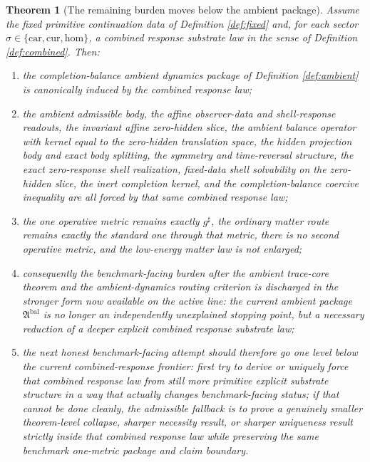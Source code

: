 \documentclass[11pt]{article}
\newcommand{\CompletedMetric}{g^{\sharp}}
\newcommand{\AmbientPackage}{\mathfrak A^{\mathrm{bal}}}
\newcommand{\Car}{\mathrm{car}}
\newcommand{\Cur}{\mathrm{cur}}
\newcommand{\Hom}{\mathrm{hom}}
\newtheorem{theorem}{Theorem}
\begin{document}
\begin{theorem}[The remaining burden moves below the ambient package]
\label{thm:main}
Assume the fixed primitive continuation data of Definition \ref{def:fixed} and, for each sector \(\sigma\in\{\Car,\Cur,\Hom\}\), a combined response substrate law in the sense of Definition \ref{def:combined}. Then:
\begin{enumerate}
    \item the completion-balance ambient dynamics package of Definition \ref{def:ambient} is canonically induced by the combined response law;
    \item the ambient admissible body, the affine observer-data and shell-response readouts, the invariant affine zero-hidden slice, the ambient balance operator with kernel equal to the zero-hidden translation space, the hidden projection body and exact body splitting, the symmetry and time-reversal structure, the exact zero-response shell realization, fixed-data shell solvability on the zero-hidden slice, the inert completion kernel, and the completion-balance coercive inequality are all forced by that same combined response law;
    \item the one operative metric remains exactly \(\CompletedMetric\), the ordinary matter route remains exactly the standard one through that metric, there is no second operative metric, and the low-energy matter law is not enlarged;
    \item consequently the benchmark-facing burden after the ambient trace-core theorem and the ambient-dynamics routing criterion is discharged in the stronger form now available on the active line: the current ambient package \(\AmbientPackage\) is no longer an independently unexplained stopping point, but a necessary reduction of a deeper explicit combined response substrate law;
    \item the next honest benchmark-facing attempt should therefore go one level below the current combined-response frontier: first try to derive or uniquely force that combined response law from still more primitive explicit substrate structure in a way that actually changes benchmark-facing status; if that cannot be done cleanly, the admissible fallback is to prove a genuinely smaller theorem-level collapse, sharper necessity result, or sharper uniqueness result strictly inside that combined response law while preserving the same benchmark one-metric package and claim boundary.
\end{enumerate}
\end{theorem}
\end{document}
